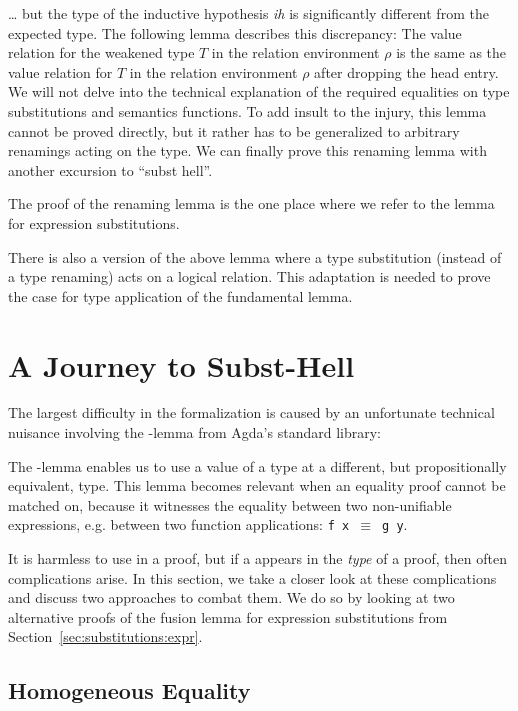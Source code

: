 \documentclass[acmsmall,anonymous,review,screen]{acmart}
\begin{document}
{\dots} but the type of the inductive hypothesis \textit{ih} is
significantly different from the expected type.
The following lemma describes this discrepancy: The value relation for
the weakened type $T$ in the relation environment $\rho$ is the same
as the value relation for $T$ in the relation environment $\rho$ after
dropping the head entry. We will not delve into the technical
explanation of the required equalities on type substitutions and
semantics functions.
\LRVrenLRVwk
To add insult to the injury, this lemma cannot be proved directly, but
it rather has to be generalized to arbitrary renamings acting on the
type.
We can finally prove this renaming lemma with another excursion to
``subst hell''.
\LRVrenLRVrenEqType

The proof of the renaming lemma is the one place where we refer to the
lemma {\AFusionESubESub} for expression substitutions.

There is also a version {\ALRVsub} of the above lemma where a type substitution
(instead of a type renaming) acts on a logical relation. This
adaptation is needed to prove the case for type application of the
fundamental lemma.

\section{A Journey to Subst-Hell}
\label{sec:subst-hell}

The largest difficulty in the formalization is caused by an unfortunate
technical nuisance involving the {\Asubst}-lemma from Agda's standard library:

\SubstExamplesDef

The {\Asubst}-lemma enables us to use a value of a type at a different,
but propositionally equivalent, type.
This lemma becomes relevant when an equality proof cannot be matched
on, because it witnesses the equality between two non-unifiable
expressions, e.g. between two function applications: \texttt{f x $\equiv$ g y}.

It is harmless to use {\Asubst} in a proof, but if a {\Asubst} appears
in the \emph{type} of a proof, then often complications arise.
In this section, we take a closer look at these complications and
discuss two approaches to combat them. We do so by looking at two
alternative proofs of the fusion lemma for expression substitutions from
Section~\ref{sec:substitutions:expr}.

\subsection{Homogeneous Equality}
\label{sec:subst-hell:hom}
\end{document}
